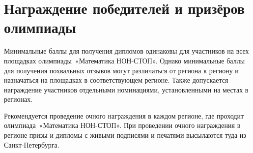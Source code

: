 \documentclass[a4paper,12pt]{article}
\newcommand{\mns}{«Математика НОН-СТОП»\xspace}
\begin{document}
\section{Награждение победителей и призёров олимпиады}

Минимальные баллы для получения дипломов одинаковы для участников на всех площадках олимпиады~\mns. Однако минимальные баллы для получения похвальных отзывов могут различаться от региона к региону и назначаться на площадках в соответствующем регионе. Также допускается награждение участников отдельными номинациями, установленными на местах в регионах.

Рекомендуется проведение очного награждения в каждом регионе, где проходит олимпиада~\mns. При проведении очного награждения в регионе призы и дипломы с живыми подписями и печатями высылаются туда из Санкт-Петербурга.
\end{document}
